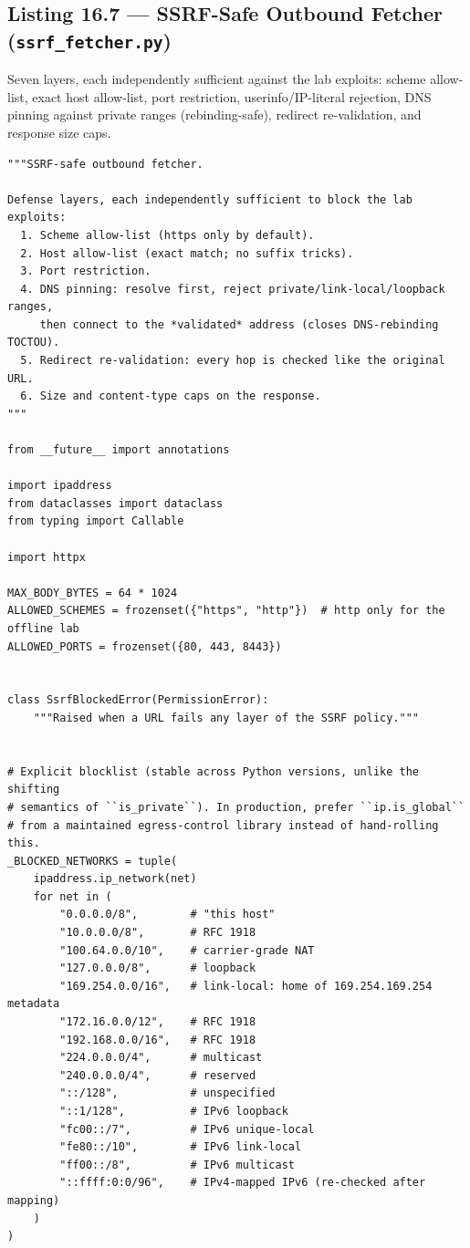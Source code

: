 \subsection{Listing 16.7 --- SSRF-Safe Outbound Fetcher (\texttt{ssrf\_fetcher.py})}
\label{lst:ch16-ssrf}

Seven layers, each independently sufficient against the lab exploits:
scheme allow-list, exact host allow-list, port restriction, userinfo/IP-literal
rejection, DNS pinning against private ranges (rebinding-safe), redirect
re-validation, and response size caps.

\begin{verbatim}
"""SSRF-safe outbound fetcher.

Defense layers, each independently sufficient to block the lab exploits:
  1. Scheme allow-list (https only by default).
  2. Host allow-list (exact match; no suffix tricks).
  3. Port restriction.
  4. DNS pinning: resolve first, reject private/link-local/loopback ranges,
     then connect to the *validated* address (closes DNS-rebinding TOCTOU).
  5. Redirect re-validation: every hop is checked like the original URL.
  6. Size and content-type caps on the response.
"""

from __future__ import annotations

import ipaddress
from dataclasses import dataclass
from typing import Callable

import httpx

MAX_BODY_BYTES = 64 * 1024
ALLOWED_SCHEMES = frozenset({"https", "http"})  # http only for the offline lab
ALLOWED_PORTS = frozenset({80, 443, 8443})


class SsrfBlockedError(PermissionError):
    """Raised when a URL fails any layer of the SSRF policy."""


# Explicit blocklist (stable across Python versions, unlike the shifting
# semantics of ``is_private``). In production, prefer ``ip.is_global``
# from a maintained egress-control library instead of hand-rolling this.
_BLOCKED_NETWORKS = tuple(
    ipaddress.ip_network(net)
    for net in (
        "0.0.0.0/8",        # "this host"
        "10.0.0.0/8",       # RFC 1918
        "100.64.0.0/10",    # carrier-grade NAT
        "127.0.0.0/8",      # loopback
        "169.254.0.0/16",   # link-local: home of 169.254.169.254 metadata
        "172.16.0.0/12",    # RFC 1918
        "192.168.0.0/16",   # RFC 1918
        "224.0.0.0/4",      # multicast
        "240.0.0.0/4",      # reserved
        "::/128",           # unspecified
        "::1/128",          # IPv6 loopback
        "fc00::/7",         # IPv6 unique-local
        "fe80::/10",        # IPv6 link-local
        "ff00::/8",         # IPv6 multicast
        "::ffff:0:0/96",    # IPv4-mapped IPv6 (re-checked after mapping)
    )
)



\end{verbatim}

